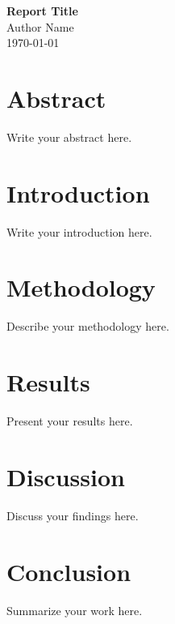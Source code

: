 \documentclass[12pt,a4paper]{report}
\begin{document}
\begin{titlepage}
    \centering
    \vspace*{2cm}
    {\Huge \textbf{Report Title}}\\
    \vspace{1.5cm}
    {\Large Author Name}\\
    \vfill
    {\large \today}\\
\end{titlepage}

\chapter*{Abstract}
Write your abstract here.

\tableofcontents
\newpage

\chapter{Introduction}
Write your introduction here.

\chapter{Methodology}
Describe your methodology here.

\chapter{Results}
Present your results here.

\chapter{Discussion}
Discuss your findings here.

\chapter{Conclusion}
Summarize your work here.

\newpage
{}


\end{document}
